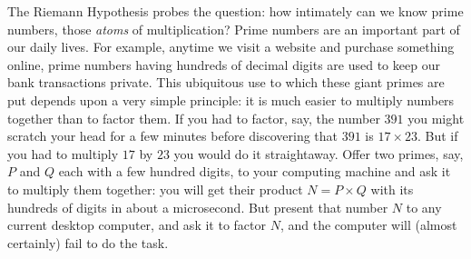 \documentclass[openany]{book}
\theoremstyle{plain}
\theoremstyle{definition}
\newcommand{\RH}{Riemann Hypothesis\index{Riemann Hypothesis}}
\begin{document}
The \RH{} probes the question: how intimately can we know
prime numbers, those {\em atoms} of multiplication?  Prime numbers are
an important part of our daily lives.  For example, anytime we visit a
website and purchase something online, prime numbers having hundreds of
decimal digits are used to keep our bank transactions private.  This
ubiquitous use to which these giant primes are put depends upon a very
simple principle: it is much easier to multiply numbers together than
to factor them. If you had to factor, say, the number $391$ you might
scratch your head for a few minutes before discovering that $391$ is
$17\times 23$. But if you had to multiply $17$ by $23$ you would do it
straightaway.  Offer two primes, say, $P$ and $Q$ each with a few hundred
digits, to your computing machine and ask it to multiply them
together: you will get their product $N = P\times Q$ with its hundreds of digits
in about a microsecond. But present that number $N$ to any
current desktop computer, and ask it to factor $N$, and the computer
will (almost certainly) fail to do the task.
\end{document}
